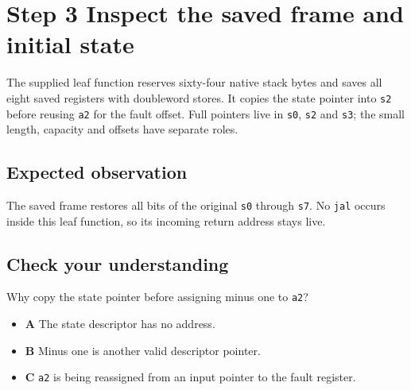 \section{Step 3 Inspect the saved frame and initial state}\label{vm-s03}

The supplied leaf function reserves sixty-four native stack bytes and saves all eight saved registers with doubleword stores. It copies the state pointer into \texttt{s2} before reusing \texttt{a2} for the fault offset. Full pointers live in \texttt{s0}, \texttt{s2} and \texttt{s3}; the small length, capacity and offsets have separate roles.

\subsection{Expected observation}
The saved frame restores all bits of the original \texttt{s0} through \texttt{s7}. No \texttt{jal} occurs inside this leaf function, so its incoming return address stays live.

\subsection{Check your understanding}
Why copy the state pointer before assigning minus one to \texttt{a2}?

\begin{itemize}
  \item \textbf{A} The state descriptor has no address.
  \item \textbf{B} Minus one is another valid descriptor pointer.
  \item \textbf{C} \texttt{a2} is being reassigned from an input pointer to the fault register.
\end{itemize}
